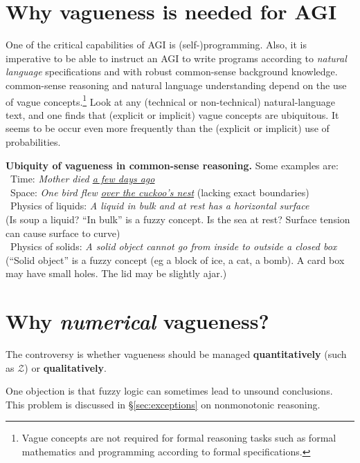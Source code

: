 \section{Why vagueness is needed for AGI}
\label{sec:whyZ}

One of the critical capabilities of AGI is (self-)programming.  Also, it is imperative to be able to instruct an AGI to write programs according to \textit{natural language} specifications and with robust common-sense background knowledge.  common-sense reasoning and natural language understanding depend on the use of vague concepts.\footnote{Vague concepts are not required for formal reasoning tasks such as formal mathematics and programming according to formal specifications.}  Look at any (technical or non-technical) natural-language text, and one finds that (explicit or implicit) vague concepts are ubiquitous.  It seems to be occur even more frequently than the (explicit or implicit) use of probabilities.

\textbf{Ubiquity of vagueness in common-sense reasoning.}  Some examples are:\\
\textbullet \, Time: \textit{Mother died \underline{a few days ago}}\\
\textbullet \, Space: \textit{One bird flew \underline{over the cuckoo's nest}} \hspace*{0.5cm} (lacking exact boundaries)\\
\textbullet \, Physics of liquids: \textit{A liquid in bulk and at rest has a horizontal surface}\\ (Is soup a liquid? ``In bulk'' is a fuzzy concept. Is the sea at rest? Surface tension can cause surface to curve)\\
\textbullet \, Physics of solids: \textit{A solid object cannot go from inside to outside a closed box}\\  (``Solid object'' is a fuzzy concept (eg a block of ice, a cat, a bomb). A card box may have small holes. The lid may be slightly ajar.)

\section{Why \textit{numerical} vagueness?}

The controversy is whether vagueness should be managed \textbf{quantitatively} (such as $\mathcal{Z}$) or \textbf{qualitatively}.

One objection is that fuzzy logic can sometimes lead to unsound conclusions.  This problem is discussed in \S\ref{sec:exceptions} on nonmonotonic reasoning.

